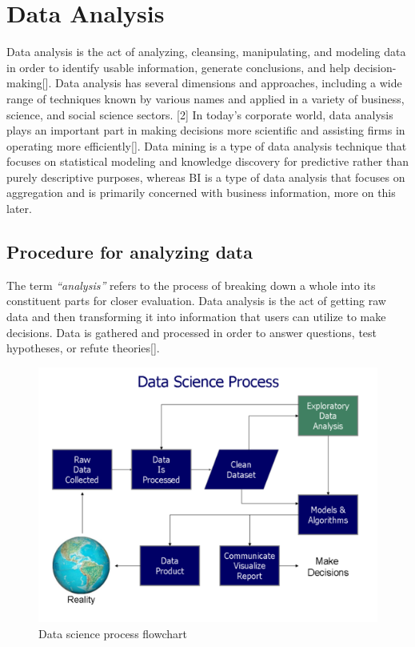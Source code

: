 \section{Data Analysis}
Data analysis is the act of analyzing, cleansing, manipulating, and modeling data in order to identify usable information, generate conclusions, and help decision-making[].
Data analysis has several dimensions and approaches, including a wide range of techniques known by various names and applied in a variety of business, science, and social science sectors. [2]
In today's corporate world, data analysis plays an important part in making decisions more scientific and assisting firms in operating more efficiently[].
Data mining is a type of data analysis technique that focuses on statistical modeling and knowledge discovery for predictive rather than purely descriptive purposes,
whereas \ac{BI} is a type of data analysis that focuses on aggregation and is primarily concerned with business information, more on this later.

\subsection{Procedure for analyzing data}
The term \textit{``analysis''} refers to the process of breaking down a whole into its constituent parts for closer evaluation.
Data analysis is the act of getting raw data and then transforming it into information that users can utilize to make decisions.
Data is gathered and processed in order to answer questions, test hypotheses, or refute theories[].

\begin{figure}[ht]
    \centering
    \includegraphics[width=\textwidth]{content/chapter_1/images/Data_visualization_process_v1.png}
    \caption{Data science process flowchart \cite{Book:doing_data_science}}
    \label{fig:data-science-flowchart}
\end{figure}

